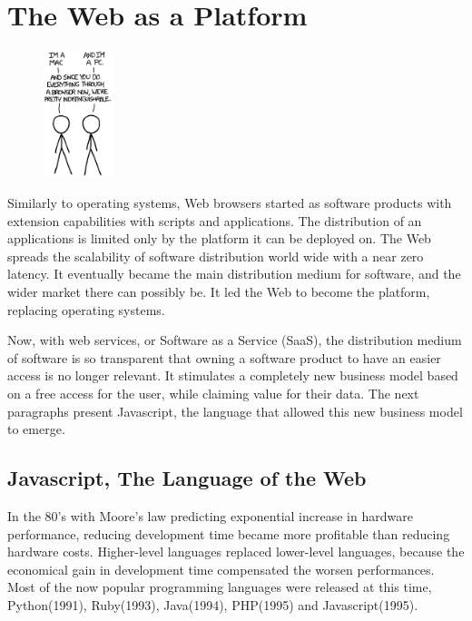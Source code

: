 \section{The Web as a Platform} \label{chapter2:web-as-a-platform}

\begin{figure}
  \vspace{-27pt}
  \begin{center}
    \includegraphics[width=0.18\textwidth]{../ressources/Mac-PC.png}
  \end{center}
  \vspace{-20pt}
\end{figure}

Similarly to operating systems, Web browsers started as software products with extension capabilities with scripts and applications.
The distribution of an applications is limited only by the platform it can be deployed on.
The Web spreads the scalability of software distribution world wide with a near zero latency.
It eventually became the main distribution medium for software, and the wider market there can possibly be.
It led the Web to become the platform, replacing operating systems.

Now, with web services, or Software as a Service (SaaS), the distribution medium of software is so transparent that owning a software product to have an easier access is no longer relevant.
It stimulates a completely new business model based on a free access for the user, while claiming value for their data.
The next paragraphs present Javascript, the language that allowed this new business model to emerge.

\subsection{Javascript, The Language of the Web}

In the 80's with Moore's law predicting exponential increase in hardware performance, reducing development time became more profitable than reducing hardware costs.
Higher-level languages replaced lower-level languages, because the economical gain in development time compensated the worsen performances.
Most of the now popular programming languages were released at this time, Python(1991), Ruby(1993), Java(1994), PHP(1995) and Javascript(1995).

